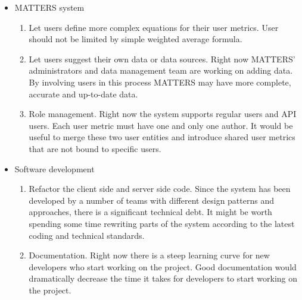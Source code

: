 		\begin{itemize}
			\item MATTERS system
				\begin{enumerate}
					\item
						Let users define more complex equations for their user metrics.
						User should not be limited by simple weighted average formula.
					\item
						Let users suggest their own data or data sources. Right now 
						MATTERS' administrators and data management team are working on
						adding data. By involving users in this process MATTERS may have 
						more complete, accurate and up-to-date data.
					\item
						Role management. Right now the system supports regular users and API users. 
						Each user metric must have one and only one author. It would be useful 
						to merge these two user entities and introduce shared user metrics that are 
						not bound to specific users.
				\end{enumerate}
			\item Software development
				\begin{enumerate}
					\item
						Refactor the client side and server side code. Since the system 
						has been developed by a number of teams with different design 
						patterns and approaches, there is a significant technical debt. 
						It might be worth spending some time rewriting parts of the system 
						according to the latest coding and technical standards.
					\item
						Documentation. Right now there is a steep learning curve for new 
						developers who start working on the project. Good documentation would 
						dramatically decrease the time it takes for developers to start working 
						on the project.
				\end{enumerate}
		\end{itemize}
